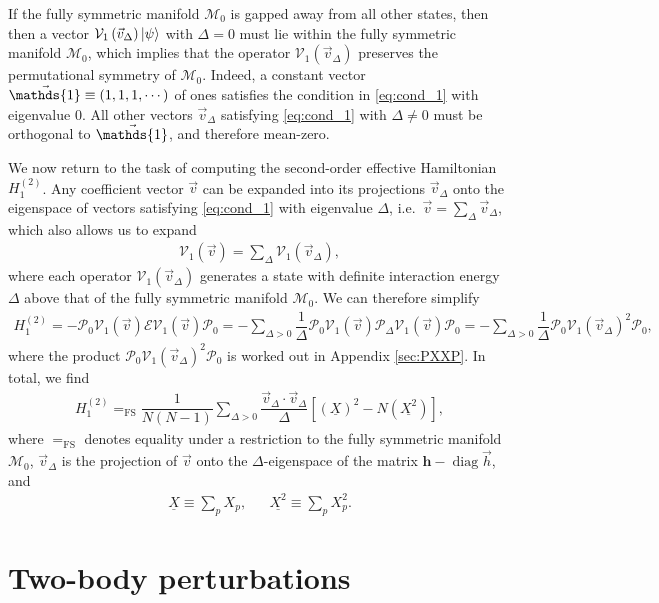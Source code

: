 \documentclass[nofootinbib,notitlepage,11pt]{revtex4-2}
\newcommand{\f}[2]{\dfrac{#1}{#2}} %
\newcommand{\p}[1]{\left(#1\right)} %
\renewcommand{\sp}[1]{\left[#1\right]} %
\renewcommand{\c}{\cdot} %
\newcommand{\m}{\bm} %
\renewcommand{\v}{\vec} %
\newcommand{\1}{\mathds{1}}
\newcommand{\E}{\mathcal{E}}
\newcommand{\M}{\mathcal{M}}
\renewcommand{\P}{\mathcal{P}}
\newcommand{\V}{\mathcal{V}}
\newcommand{\EQFS}{=_{\text{FS}}}
\newcommand{\col}{\underline}
\DeclareMathOperator{\diag}{diag}
\begin{document}
If the fully symmetric manifold $\M_0$ is gapped away from all other
states, then then a vector $\V_1\p{\v v_\Delta}\ket\psi$ with
$\Delta=0$ must lie within the fully symmetric manifold $\M_0$, which
implies that the operator $\V_1\p{\v v_\Delta}$ preserves the
permutational symmetry of $\M_0$.  Indeed, a constant vector
$\v\1\equiv\p{1,1,1,\cdots}$ of ones satisfies the condition in
\eqref{eq:cond_1} with eigenvalue $0$.  All other vectors
$\v v_\Delta$ satisfying \eqref{eq:cond_1} with $\Delta\ne0$ must be
orthogonal to $\v\1$, and therefore mean-zero.

We now return to the task of computing the second-order effective
Hamiltonian $H_1^{(2)}$.  Any coefficient vector $\v v$ can be
expanded into its projections $\v v_\Delta$ onto the eigenspace of
vectors satisfying \eqref{eq:cond_1} with eigenvalue $\Delta$,
i.e.~$\v v = \sum_\Delta \v v_\Delta$, which also allows us to expand
\begin{align}
  \V_1\p{\v v} = \sum_\Delta \V_1\p{\v v_\Delta},
\end{align}
where each operator $\V_1\p{\v v_\Delta}$ generates a state with
definite interaction energy $\Delta$ above that of the fully symmetric
manifold $\M_0$.  We can therefore simplify
\begin{align}
  H_1^{(2)}
  = - \P_0 \V_1\p{\v v} \E \V_1\p{\v v} \P_0
  = - \sum_{\Delta>0} \f1{\Delta}
  \P_0 \V_1\p{\v v} \P_\Delta \V_1\p{\v v} \P_0
  = - \sum_{\Delta>0} \f1{\Delta} \P_0 \V_1\p{\v v_\Delta}^2 \P_0,
\end{align}
where the product $\P_0 \V_1\p{\v v_\Delta}^2 \P_0$ is worked out in
Appendix \ref{sec:PXXP}.  In total, we find
\begin{align}
  H_1^{(2)}
  \EQFS \f1{N\p{N-1}}
  \sum_{\Delta>0} \f{\v v_\Delta\c\v v_\Delta}{\Delta}
  \sp{\p{\col{X}}^2 - N \p{\col{X^2}}},
  \label{eq:H_1_2}
\end{align}
where $\EQFS$ denotes equality under a restriction to the fully
symmetric manifold $\M_0$, $\v v_\Delta$ is the projection of $\v v$
onto the $\Delta$-eigenspace of the matrix $\m h-\diag\v h$, and
\begin{align}
  \col{X} \equiv \sum_p X_p,
  &&
  \col{X^2} \equiv \sum_p X_p^2.
\end{align}

\section{Two-body perturbations}
\end{document}
